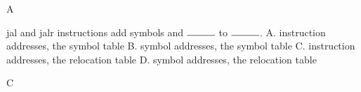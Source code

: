 \begin{blocksection}
\begin{parts}
\begin{solution}
    A
\end{solution}

\item
jal and jalr instructions add symbols and $\rule{1cm}{0.15mm}$ to $\rule{1cm}{0.15mm}$. \newline
A. instruction addresses, the symbol table \newline
B. symbol addresses, the symbol table \newline
C. instruction addresses, the relocation table \newline 
D. symbol addresses, the relocation table

\begin{solution}
    C
\end{solution}
\end{parts}
\end{blocksection}